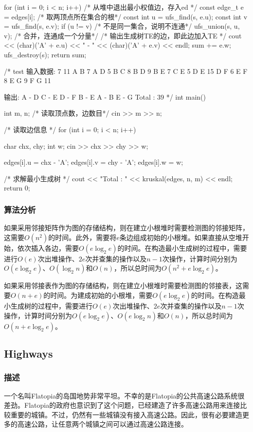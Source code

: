 \begin{Codex}[label=kruskal.cpp]
{    for (int i = 0; i < n; i++) {
        /* 从堆中退出最小权值边，存入ed */
        const edge_t e = edges[i];
        /* 取两顶点所在集合的根*/
        const int u = ufs_find(s, e.u);
        const int v = ufs_find(s, e.v);
        if (u != v) { /* 不是同一集合，说明不连通*/
            ufs_union(s, u, v); /* 合并，连通成一个分量*/
            /* 输出生成树TE的边，即此边加入TE */
            cout << (char)('A' + e.u) << " - " << (char)('A' + e.v) << endl;
            sum += e.w;
        }
    }
    ufs_destroy(s);
    return sum;
}

/* test
输入数据:
7 11
A B 7
A D 5
B C 8
B D 9
B E 7
C E 5
D E 15
D F 6
E F 8
E G 9
F G 11

输出:
A - D
C - E
D - F
B - E
A - B
E - G
Total : 39
*/
int main() {
    int m, n;
    /* 读取顶点数，边数目*/
    cin >> m >> n;

    /* 读取边信息 */
    for (int i = 0; i < n; i++) {
        char chx, chy;
        int w;
        cin >> chx >> chy >> w;

        edges[i].u = chx - 'A';
        edges[i].v = chy - 'A';
        edges[i].w = w;
    }

    /* 求解最小生成树 */
    cout << "Total : " << kruskal(edges, n, m) << endl;
    return 0;
}
\end{Codex}

\subsubsection{算法分析}
如果采用邻接矩阵作为图的存储结构，则在建立小根堆时需要检测图的邻接矩阵，这需要$O(n^2)$的时间。此外，需要将$e$条边组成初始的小根堆。如果直接从空堆开始，依次插入各边，需要$O(e\log_2e)$的时间。在构造最小生成树的过程中，需要进行$O(e)$次出堆操作、$2e$次并查集的操作以及$n-1$次操作，计算时间分别为$O(e\log_2e)$、$O(\log_2n)$和$O(n)$，所以总时间为$O(n^2+e\log_2e)$。

如果采用邻接表作为图的存储结构，则在建立小根堆时需要检测图的邻接表，这需要$O(n+e)$的时间。为建成初始的小根堆，需要$O(e\log_2e)$的时间。在构造最小生成树的过程中，需要进行$O(e)$次出堆操作、$2e$次并查集的操作以及$n-1$次操作，计算时间分别为$O(e\log_2e)$、$O(e\log_2n)$和$O(n)$，所以总时间为$O(n+e\log_2e)$。


\subsection{Highways}
\subsubsection{描述}
一个名叫Flatopia的岛国地势非常平坦。不幸的是Flatopia的公共高速公路系统很差劲。Flatopia的政府也意识到了这个问题，已经建造了许多高速公路用来连接比较重要的城镇。不过，仍然有一些城镇没有接入高速公路。因此，很有必要建造更多的高速公路，让任意两个城镇之间可以通过高速公路连接。

